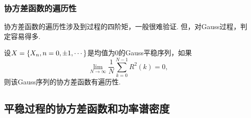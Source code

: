 \begin{frame}
    \frametitle{协方差函数的遍历性}
    协方差函数的遍历性涉及到过程的四阶矩，一般很难验证. 但，对Gauss过程，判定容易得多. 
    \begin{mytheorem}[Gauss序列协方差函数的遍历性]
        设$X=\left\{X_n,n=0,\pm1,\cdots\right\}$是均值为0的Gauss平稳序列，如果
        \begin{equation}
            \lim_{N\to\infty}\frac1N\sum_{k=0}^{N-1}R^2(k)=0,
        \end{equation}
        则该Gauss序列的协方差函数有遍历性. 
    \end{mytheorem}
\end{frame}

\subsection{平稳过程的协方差函数和功率谱密度}

